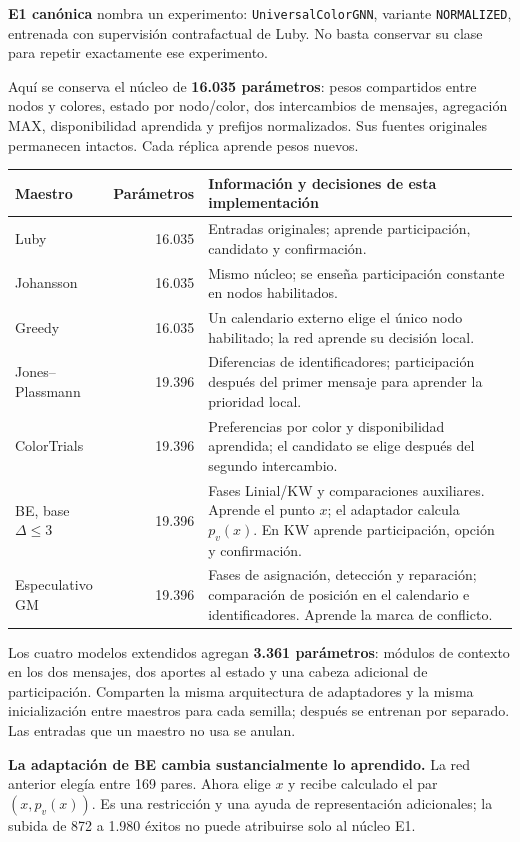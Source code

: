\documentclass[11pt,a4paper]{article}
\newcommand{\subhead}[1]{\vspace{2mm}{\large\bfseries\color{navy}#1\par}\vspace{1mm}}
\begin{document}
\textbf{E1 canónica} nombra un experimento: \texttt{UniversalColorGNN}, variante
\texttt{NORMALIZED}, entrenada con supervisión contrafactual de Luby.
No basta conservar su clase para repetir exactamente ese experimento.

Aquí se conserva el núcleo de \textbf{16.035 parámetros}: pesos compartidos
entre nodos y colores, estado por nodo/color, dos intercambios de mensajes,
agregación MAX, disponibilidad aprendida y prefijos normalizados. Sus fuentes
originales permanecen intactos. Cada réplica aprende pesos nuevos.

\subhead{Cambios específicos para cada maestro}
\begingroup\small
\begin{tabularx}{\linewidth}{@{}p{27mm}rY@{}}
\toprule
Maestro & Parámetros & Información y decisiones de esta implementación\\
\midrule
Luby & 16.035 & Entradas originales; aprende participación, candidato y confirmación.\\
Johansson & 16.035 & Mismo núcleo; se enseña participación constante en nodos habilitados.\\
Greedy & 16.035 & Un calendario externo elige el único nodo habilitado; la red aprende su decisión local.\\
Jones--Plassmann & 19.396 & Diferencias de identificadores; participación después del primer mensaje para aprender la prioridad local.\\
ColorTrials & 19.396 & Preferencias por color y disponibilidad aprendida; el candidato se elige después del segundo intercambio.\\
BE, base $\Delta\leq3$ & 19.396 & Fases Linial/KW y comparaciones auxiliares. Aprende el punto $x$; el adaptador calcula $p_v(x)$. En KW aprende participación, opción y confirmación.\\
Especulativo GM & 19.396 & Fases de asignación, detección y reparación; comparación de posición en el calendario e identificadores. Aprende la marca de conflicto.\\
\bottomrule
\end{tabularx}
\endgroup

Los cuatro modelos extendidos agregan \textbf{3.361 parámetros}: módulos de
contexto en los dos mensajes, dos aportes al estado y una cabeza adicional de
participación. Comparten la misma arquitectura de adaptadores y la misma
inicialización entre maestros para cada semilla; después se entrenan por separado.
Las entradas que un maestro no usa se anulan.

\begin{finding}
\textbf{La adaptación de BE cambia sustancialmente lo aprendido.} La red
anterior elegía entre 169 pares. Ahora elige $x$ y recibe calculado el par
$(x,p_v(x))$. Es una restricción y una ayuda de representación adicionales;
la subida de 872 a 1.980 éxitos no puede atribuirse solo al núcleo E1.
\end{finding}
\end{document}
